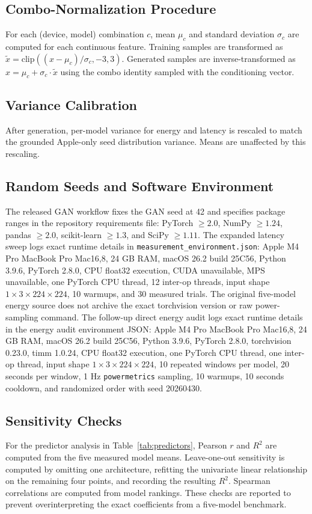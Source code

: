 \documentclass[conference]{IEEEtran}
\begin{document}
\subsection{Combo-Normalization Procedure}
For each (device, model) combination $c$, mean $\mu_c$ and standard deviation
$\sigma_c$ are computed for each continuous feature. Training samples are
transformed as $\tilde{x} = \mathrm{clip}((x - \mu_c)/\sigma_c, -3, 3)$.
Generated samples are inverse-transformed as $x = \mu_c + \sigma_c \cdot \tilde{x}$
using the combo identity sampled with the conditioning vector.

\subsection{Variance Calibration}
After generation, per-model variance for energy and latency is rescaled to
match the grounded Apple-only seed distribution variance. Means are unaffected
by this rescaling.

\subsection{Random Seeds and Software Environment}
The released GAN workflow fixes the GAN seed at 42 and specifies package
ranges in the repository requirements file: PyTorch $\geq 2.0$, NumPy
$\geq 1.24$, pandas $\geq 2.0$, scikit-learn $\geq 1.3$, and SciPy
$\geq 1.11$. The expanded latency sweep logs exact runtime details in
\texttt{measurement\_environment.json}: Apple M4 Pro MacBook Pro Mac16,8,
24 GB RAM, macOS 26.2 build 25C56, Python 3.9.6, PyTorch 2.8.0, CPU float32
execution, CUDA unavailable, MPS unavailable, one PyTorch CPU thread, 12
inter-op threads, input shape $1 \times 3 \times 224 \times 224$, 10 warmups,
and 30 measured trials. The original five-model energy source does not archive
the exact torchvision version or raw power-sampling command. The follow-up
direct energy audit logs exact runtime details in the energy audit environment
JSON: Apple M4 Pro MacBook Pro Mac16,8, 24 GB RAM, macOS 26.2 build
25C56, Python 3.9.6, PyTorch 2.8.0, torchvision 0.23.0, timm 1.0.24, CPU
float32 execution, one PyTorch CPU thread, one inter-op thread, input shape
$1 \times 3 \times 224 \times 224$, 10 repeated windows per model, 20 seconds
per window, 1 Hz \texttt{powermetrics} sampling, 10 warmups, 10 seconds
cooldown, and randomized order with seed 20260430.

\subsection{Sensitivity Checks}
For the predictor analysis in Table~\ref{tab:predictors}, Pearson $r$ and
$R^2$ are computed from the five measured model means. Leave-one-out
sensitivity is computed by omitting one architecture, refitting the univariate
linear relationship on the remaining four points, and recording the resulting
$R^2$. Spearman correlations are computed from model rankings. These checks
are reported to prevent overinterpreting the exact coefficients from a
five-model benchmark.
\end{document}
